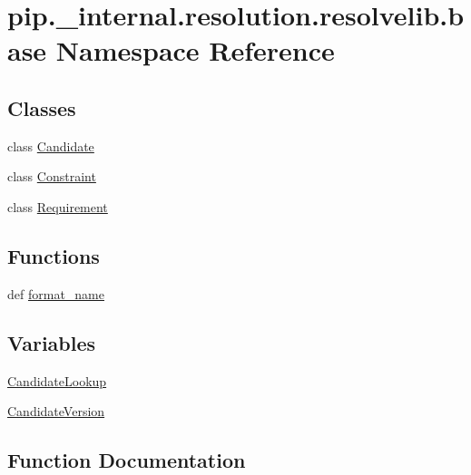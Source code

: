 \hypertarget{namespacepip_1_1__internal_1_1resolution_1_1resolvelib_1_1base}{}\section{pip.\+\_\+internal.\+resolution.\+resolvelib.\+base Namespace Reference}
\label{namespacepip_1_1__internal_1_1resolution_1_1resolvelib_1_1base}
\subsection*{Classes}
\begin{DoxyCompactItemize}
\item 
class \hyperlink{classpip_1_1__internal_1_1resolution_1_1resolvelib_1_1base_1_1Candidate}{Candidate}
\item 
class \hyperlink{classpip_1_1__internal_1_1resolution_1_1resolvelib_1_1base_1_1Constraint}{Constraint}
\item 
class \hyperlink{classpip_1_1__internal_1_1resolution_1_1resolvelib_1_1base_1_1Requirement}{Requirement}
\end{DoxyCompactItemize}
\subsection*{Functions}
\begin{DoxyCompactItemize}
\item 
def \hyperlink{namespacepip_1_1__internal_1_1resolution_1_1resolvelib_1_1base_a88524c6d1acb8a9a2e06a308e95b5cd2}{format\+\_\+name}
\end{DoxyCompactItemize}
\subsection*{Variables}
\begin{DoxyCompactItemize}
\item 
\hyperlink{namespacepip_1_1__internal_1_1resolution_1_1resolvelib_1_1base_a7a2c09bcc8e3ed1bda952dd7706ecfb9}{Candidate\+Lookup}
\item 
\hyperlink{namespacepip_1_1__internal_1_1resolution_1_1resolvelib_1_1base_a8682b7cdbe043314a124e3ddecee4429}{Candidate\+Version}
\end{DoxyCompactItemize}


\subsection{Function Documentation}
\mbox{\label{namespacepip_1_1__internal_1_1resolution_1_1resolvelib_1_1base_a88524c6d1acb8a9a2e06a308e95b5cd2}} 
